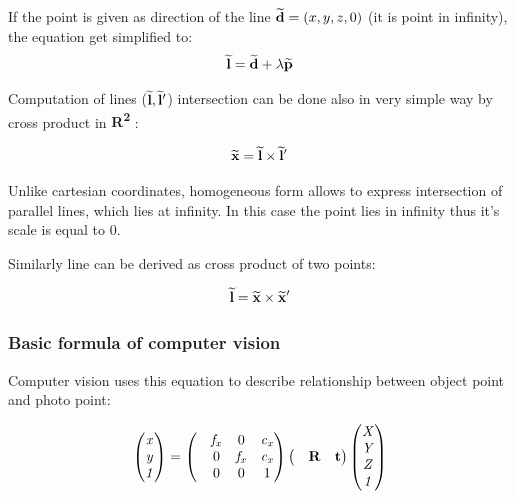 \documentclass[a4paper,12pt]{article}
\newcommand{\ematr}[1]{
{\bf #1}
}
\newcommand{\evect}[1]{
{\bf #1}
}
\newcommand{\ehvect}[1]{
{\bf \widetilde{#1}}
}
\newcommand{\escal}[1]{
{\it #1}
}
\newcommand{\eucl}[1]{
{\bf R\textsuperscript{#1}}
}
\begin{document}
If the point is given as direction of the line $\ehvect{d} = (x, y, z, 0)$ (it is point in infinity), the equation get simplified to:
\begin{equation}
\label{eq:hline}
\ehvect{l} = \ehvect{d} + \escal{\lambda}\ehvect{p}
\end{equation}

Computation of lines ($\ehvect{l}, \ehvect{l}'$) intersection  can be done also in very simple way by cross product in \eucl{2}:

\begin{equation}
\ehvect{x} = \ehvect{l} \times \ehvect{l}' \label{eq:def_hline_pts}
\end{equation}

Unlike cartesian coordinates, homogeneous form allows to express intersection of parallel lines, which lies at infinity. 
In this case the point lies in infinity thus it's scale is equal to 0.

Similarly line can be derived as cross product of two points:

\begin{equation}
\ehvect{l} = \ehvect{x} \times \ehvect{x}'
\end{equation}


\subsubsection{Basic formula of computer vision}

Computer vision uses this equation to describe relationship between
object point and photo point:

\begin{equation}
\begin{pmatrix}
   \escal{x} \\
   \escal{y} \\
   \escal{1} \\
\end{pmatrix}
=
\begin{pmatrix}
   & \escal{f_{x}} & 0     & \escal{c_{x}}\\
   & 0     & \escal{f_{x}} & \escal{c_{x}}\\
   & 0     & 0     & 1\\
\end{pmatrix}
\begin{pmatrix}
&\ematr{R}&\evect{t}\\
\end{pmatrix}
\begin{pmatrix}
   \escal{X} \\
   \escal{Y} \\
   \escal{Z} \\
   \escal{1} \\
\end{pmatrix}
\end{equation}
\end{document}
